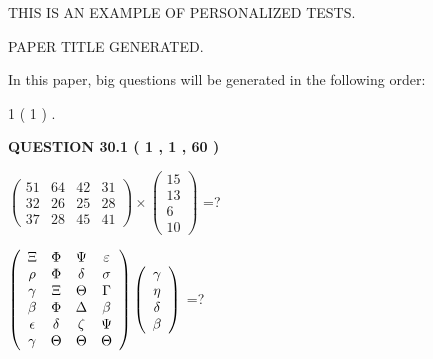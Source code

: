 \documentclass[12pt]{article}
\begin{document}
   
   
   
   
   
 \vspace{0.2in}
{\Huge  THIS IS AN EXAMPLE OF}
{\Huge  PERSONALIZED TESTS. }
   
   
 PAPER TITLE GENERATED.
   
   
   
\vspace{0.2in}
   
In this paper, big questions will be generated in the following order: 
   
   
   1 ( 1 )
 .
  
\vspace{0.2in}
  
{\textbf{\Large{QUESTION
30.1 
 ( 1 , 1 , 60 )
}}}
  
  
 
$ \left( \begin{array}{ccccccccc}
 51  & 
 64  & 
 42  & 
 31  \\ 
 32  & 
 26  & 
 25  & 
 28  \\ 
 37  & 
 28  & 
 45  & 
 41
\end{array}\right) \times
\left( \begin{array}{c}
 15  \\ 
 13  \\ 
 6  \\ 
 10
\end{array}\right) $ =?
 
 
$  %
 \left( \begin{array}
 {
 c
 c
 c
 c
 }
                    \Xi & 
 \Phi & 
 \Psi & 
 \varepsilon \\ 
 \rho & 
 \Phi & 
 \delta & 
 \sigma \\ 
 \gamma & 
                    \Xi & 
 \Theta & 
 \Gamma \\ 
 \beta & 
 \Phi & 
 \Delta & 
 \beta \\ 
 \epsilon & 
 \delta & 
                    \zeta & 
 \Psi \\ 
 \gamma & 
 \Theta & 
 \Theta & 
 \Theta
 \end{array} \right)
 \left( \begin{array}
 {
 c
 }
 \gamma \\ 
 \eta \\ 
 \delta \\ 
 \beta
 \end{array} \right)
$ =?
 
 
 
\noindent{}
 
\end{document}
